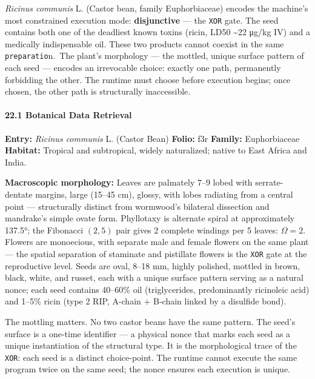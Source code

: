 \emph{Ricinus communis} L. (Castor bean, family Euphorbiaceae) encodes
the machine's most constrained execution mode: \textbf{disjunctive} ---
the \texttt{XOR} gate. The seed contains both one of the deadliest known
toxins (ricin, LD50 \textasciitilde22 μg/kg IV) and a medically
indispensable oil. These two products cannot coexist in the same
\texttt{preparatio}n.~The plant's morphology --- the mottled, unique
surface pattern of each seed --- encodes an irrevocable choice: exactly
one path, permanently forbidding the other. The runtime must choose
before execution begins; once chosen, the other path is structurally
inaccessible.

\hypertarget{botanical-data-retrieval-2}{%
\paragraph{22.1 Botanical Data
Retrieval}\label{botanical-data-retrieval-2}}

\textbf{Entry:} \emph{Ricinus communis} L. (Castor Bean) \textbf{Folio:}
f3r \textbf{Family:} Euphorbiaceae \textbf{Habitat:} Tropical and
subtropical, widely naturalized; native to East Africa and India.

\textbf{Macroscopic morphology:} Leaves are palmately 7--9 lobed with
serrate-dentate margins, large (15--45 cm), glossy, with lobes radiating
from a central point --- structurally distinct from wormwood's bilateral
dissection and mandrake's simple ovate form. Phyllotaxy is alternate
spiral at approximately 137.5°; the Fibonacci \((2,5)\) pair gives 2
complete windings per 5 leaves: \(\Omega = 2\). Flowers are monoecious,
with separate male and female flowers on the same plant --- the spatial
separation of staminate and pistillate flowers is the \texttt{XOR} gate
at the reproductive level. Seeds are oval, 8--18 mm, highly polished,
mottled in brown, black, white, and russet, each with a unique surface
pattern serving as a natural nonce; each seed contains 40--60\% oil
(triglycerides, predominantly ricinoleic acid) and 1--5\% ricin (type 2
RIP, A-chain + B-chain linked by a disulfide bond).

The mottling matters. No two castor beans have the same pattern. The
seed's surface is a one-time identifier --- a physical nonce that marks
each seed as a unique instantiation of the structural type. It is the
morphological trace of the \texttt{XOR}: each seed is a distinct
choice-point. The runtime cannot execute the same program twice on the
same seed; the nonce ensures each execution is unique.

